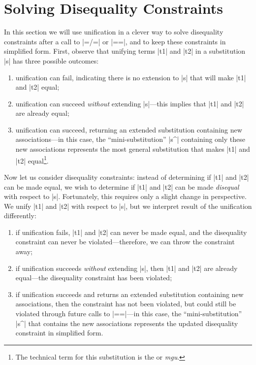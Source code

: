 \section{Solving Disequality Constraints}\label{solvediseq}

In this section we will use unification in a clever way to solve
disequality constraints after a call to \scheme|=/=| or \scheme|==|,
and to keep these constraints in simplified form.  First, observe that
unifying terms \scheme|t1| and \scheme|t2| in a substitution
\scheme|s| has three possible outcomes:

\begin{enumerate}
\item unification can fail, indicating there is no extension to
  \scheme|s| that will make \scheme|t1| and \scheme|t2| equal;
\item unification can succeed {\em without} extending
  \scheme|s|---this implies that \scheme|t1| and \scheme|t2| are
  already equal;
\item unification can succeed, returning an extended substitution
  containing new associations---in this case, the
  ``mini-substitution'' \scheme|s^| containing only these new
  associations represents the most general substitution that makes
  \scheme|t1| and \scheme|t2| equal\footnote{The technical term for
    this substitution is the  or
    \emph{mgu}.}.
\end{enumerate}

Now let us consider disequality constraints: instead of determining if
\scheme|t1| and \scheme|t2| can be made equal, we wish to determine if
\scheme|t1| and \scheme|t2| can be made \emph{disequal} with respect
to \scheme|s|.  Fortunately, this requires only a slight change in
perspective.  We unify \scheme|t1| and \scheme|t2| with respect to
\scheme|s|, but we interpret result of the unification differently:

\begin{enumerate}
\item if unification fails, \scheme|t1| and \scheme|t2| can never be
  made equal, and the disequality constraint can never be
  violated---therefore, we can throw the constraint away;
\item if unification succeeds {\em without} extending \scheme|s|, then
  \scheme|t1| and \scheme|t2| are already equal---the disequality
  constraint has been violated;
\item if unification succeeds and returns an extended substitution
  containing new associations, then the constraint has not been
  violated, but could still be violated through future calls to
  \scheme|==|---in this case, the ``mini-substitution'' \scheme|s^|
  that contains the new associations represents the updated
  disequality constraint in simplified form.
\end{enumerate}

